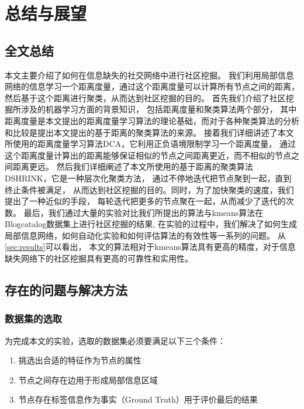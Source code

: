 \chapter{总结与展望}
\label{chap:summary}

\section{全文总结}

本文主要介绍了如何在信息缺失的社交网络中进行社区挖掘。
我们利用局部信息网络的信息学习一个距离度量，通过这个距离度量可以计算所有节点之间的距离，
然后基于这个距离进行聚类，从而达到社区挖掘的目的。
首先我们介绍了社区挖掘所涉及的机器学习方面的背景知识，
包括距离度量和聚类算法两个部分，
其中距离度量是本文提出的距离度量学习算法的理论基础，而对于各种聚类算法的分析和比较是提出本文提出的基于距离的聚类算法的来源。
接着我们详细讲述了本文所使用的距离度量学习算法DCA，它利用正负语境限制学习一个距离度量，
通过这个距离度量计算出的距离能够保证相似的节点之间距离更近，而不相似的节点之间距离更远。
然后我们详细阐述了本文所使用的基于距离的聚类算法DSHRINK，它是一种层次化聚类方法，
通过不停地迭代把节点聚到一起，直到终止条件被满足，
从而达到社区挖掘的目的。同时，为了加快聚类的速度，我们提出了一种近似的手段，
每轮迭代把更多的节点聚在一起，从而减少了迭代的次数。
最后，我们通过大量的实验对比我们所提出的算法与kmeans算法在
Blogcatalog数据集上进行社区挖掘的结果,
在实验的过程中，我们解决了如何生成局部信息网络，如何自动化实验和如何评估算法的有效性等一系列的问题。
从\ref{sec:results}可以看出， 本文的算法相对于kmeans算法具有更高的精度，对于信息缺失网络下的社区挖掘具有更高的可靠性和实用性。

\section{存在的问题与解决方法}

\subsection{数据集的选取}

为完成本文的实验，选取的数据集必须要满足以下三个条件：

\begin{enumerate}
\item 挑选出合适的特征作为节点的属性
\item 节点之间存在边用于形成局部信息区域
\item 节点存在标签信息作为事实（Ground Truth）用于评价最后的结果
\end{enumerate}

